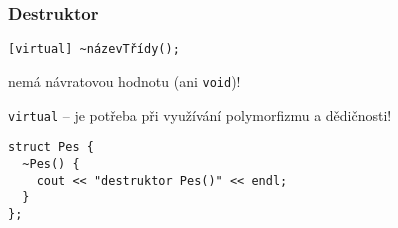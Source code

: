 \begin{frame}[fragile]
\frametitle{Destruktor}
\begin{noteblock}{}
\begin{lstlisting}
[virtual] ~názevTřídy();
\end{lstlisting}
\end{noteblock}

\begin{bitemize}
\item nemá návratovou hodnotu (ani \lstinline|void|)!
\item \lstinline|virtual| -- je potřeba při využívání polymorfizmu a dědičnosti!
\end{bitemize}

\begin{yesblock}
\begin{lstlisting}
struct Pes {
  ~Pes() {
    cout << "destruktor Pes()" << endl;
  }
};
\end{lstlisting}
\end{yesblock}
\end{frame}
